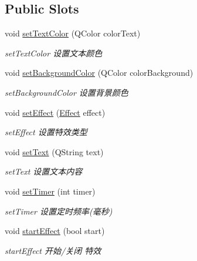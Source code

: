 \subsection*{Public Slots}
\begin{DoxyCompactItemize}
\item 
void \mbox{\hyperlink{class_q_qt_led_banner_label_a5d265f3a217fae856809426bb2bdefd1}{set\+Text\+Color}} (Q\+Color color\+Text)
\begin{DoxyCompactList}\small\item\em set\+Text\+Color 设置文本颜色 \end{DoxyCompactList}\item 
void \mbox{\hyperlink{class_q_qt_led_banner_label_aad9c08b92a1b8f3cdead97dea7ebb286}{set\+Background\+Color}} (Q\+Color color\+Background)
\begin{DoxyCompactList}\small\item\em set\+Background\+Color 设置背景颜色 \end{DoxyCompactList}\item 
void \mbox{\hyperlink{class_q_qt_led_banner_label_ac3f7a2d1212e45230f624c1cd594819d}{set\+Effect}} (\mbox{\hyperlink{class_q_qt_led_banner_label_a8ea55a34d54e6fe09a74c5fd2d83e5dc}{Effect}} effect)
\begin{DoxyCompactList}\small\item\em set\+Effect 设置特效类型 \end{DoxyCompactList}\item 
void \mbox{\hyperlink{class_q_qt_led_banner_label_ad3909e13933db40f461e3be0e89f70ea}{set\+Text}} (Q\+String text)
\begin{DoxyCompactList}\small\item\em set\+Text 设置文本内容 \end{DoxyCompactList}\item 
void \mbox{\hyperlink{class_q_qt_led_banner_label_aaea93596237af590cfe6eda708418110}{set\+Timer}} (int timer)
\begin{DoxyCompactList}\small\item\em set\+Timer 设置定时频率(毫秒) \end{DoxyCompactList}\item 
void \mbox{\hyperlink{class_q_qt_led_banner_label_a7ef35e83b878580b40468fb816072cdd}{start\+Effect}} (bool start)
\begin{DoxyCompactList}\small\item\em start\+Effect 开始/关闭 特效 \end{DoxyCompactList}\end{DoxyCompactItemize}
